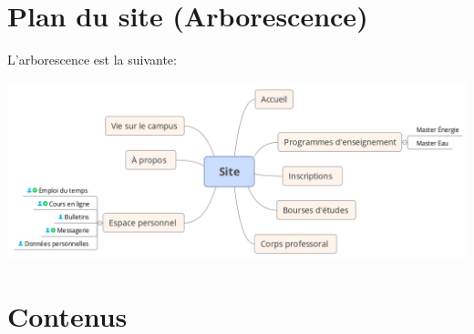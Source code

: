 \documentclass[oneside]{report}
\begin{document}
{		\section{Plan du site (Arborescence)}
		\par L'arborescence est la suivante:\\
		\begin{center}
			\includegraphics[scale=1.5]{arborescence}
		\end{center}
		\section{Contenus}
}
\end{document}
